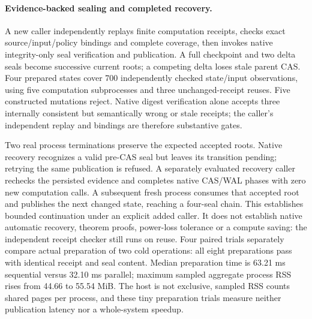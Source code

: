 \paragraph{Evidence-backed sealing and completed recovery.}
A new caller independently replays finite computation receipts, checks exact
source/input/policy bindings and complete coverage, then invokes native
integrity-only seal verification and publication. A full checkpoint and two
delta seals become successive current roots; a competing delta loses stale
parent CAS. Four prepared states cover 700 independently checked state/input
observations, using five computation subprocesses and three unchanged-receipt
reuses. Five constructed mutations reject. Native digest verification alone
accepts three internally consistent but semantically wrong or stale receipts;
the caller's independent replay and bindings are therefore substantive gates.

Two real process terminations preserve the expected accepted roots. Native
recovery recognizes a valid pre-CAS seal but leaves its transition pending;
retrying the same publication is refused. A separately evaluated recovery
caller rechecks the persisted evidence and completes native CAS/WAL phases
with zero new computation calls. A subsequent fresh process consumes that
accepted root and publishes the next changed state, reaching a four-seal chain.
This establishes bounded continuation under an explicit added caller. It does
not establish native automatic recovery, theorem proofs, power-loss tolerance
or a compute saving: the independent receipt checker still runs on reuse.
Four paired trials separately compare actual preparation of two cold operations:
all eight preparations pass with identical receipt and seal content. Median
preparation time is 63.21 ms sequential versus 32.10 ms parallel;
maximum sampled aggregate process RSS rises from 44.66 to 55.54 MiB.
The host is not exclusive, sampled RSS counts shared pages per process, and
these tiny preparation trials measure neither publication latency nor a
whole-system speedup.

